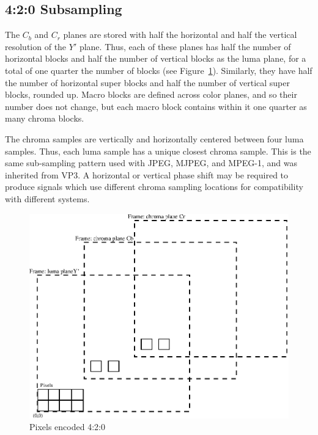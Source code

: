 \documentclass[9pt,letterpaper]{book}
\numberwithin{equation}{chapter}
\numberwithin{figure}{chapter}
\numberwithin{table}{chapter}
\begin{document}
\subsection{4:2:0 Subsampling}
\label{sec:420}

The $C_b$ and $C_r$ planes are stored with half the horizontal and half the
 vertical resolution of the $Y'$ plane.
Thus, each of these planes has half the number of horizontal blocks and half
 the number of vertical blocks as the luma plane, for a total of one quarter
 the number of blocks (see Figure~\ref{fig:pixel420}).
Similarly, they have half the number of horizontal super blocks and half the
 number of vertical super blocks, rounded up.
Macro blocks are defined across color planes, and so their number does not
 change, but each macro block contains within it one quarter as many 
 chroma blocks.

The chroma samples are vertically and horizontally centered between four luma
 samples.
Thus, each luma sample has a unique closest chroma sample.
This is the same sub-sampling pattern used with JPEG, MJPEG, and MPEG-1, and
 was inherited from VP3.
A horizontal or vertical phase shift may be required to produce signals which
 use different chroma sampling locations for compatibility with different
 systems.

\begin{figure}[htbp]
\begin{center}
\includegraphics{pixel420}
\end{center}
\caption{Pixels encoded 4:2:0}
\label{fig:pixel420}
\end{figure}
\end{document}
